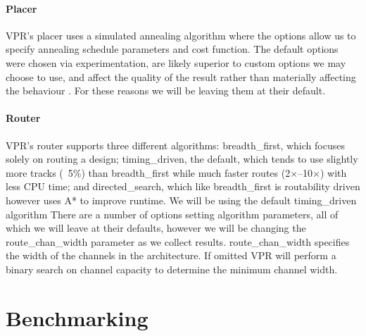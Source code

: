 \documentclass[12pt,final,oneside]{memoir} %
\begin{document}
\subsubsection{Placer}
\ac{VPR}'s placer uses a simulated annealing algorithm where the options allow us to specify annealing schedule parameters and cost function. The default options were chosen via experimentation, are likely superior to custom options we may choose to use, and affect the quality of the result rather than materially affecting the behaviour \cite{VPRManual, VPRBook}. For these reasons we will be leaving them at their default.
\subsubsection{Router}
\ac{VPR}'s router supports three different algorithms: breadth\_first, which focuses solely on routing a design; timing\_driven, the default, which tends to use slightly more tracks (~5\%) than breadth\_first while much faster routes (2$\times$--10$\times$) with less CPU time; and directed\_search, which like breadth\_first is routability driven however uses A* to improve runtime. We will be using the default timing\_driven algorithm 
There are a number of options setting algorithm parameters, all of which we will leave at their defaults, however we will be changing the route\_chan\_width parameter as we collect results. route\_chan\_width specifies the width of the channels in the architecture. If omitted \ac{VPR} will perform a binary search on channel capacity to determine the minimum channel width.

\chapter{Benchmarking}
\end{document}
